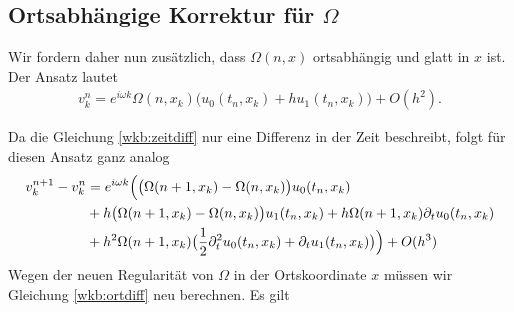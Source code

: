 \subsection*{Ortsabhängige Korrektur für $\Omega$}

Wir fordern daher nun zusätzlich, dass $\Omega(n,x)$ ortsabhängig und glatt in $x$ ist.
Der Ansatz lautet
\begin{align}
v^n_k = e^{i \omega k} \Omega(n, x_k) \bigl( u_0(t_n, x_k) + h u_1(t_n, x_k) \bigr) + O(h^2).
\end{align}

Da die Gleichung \eqref{wkb:zeitdiff} nur eine Differenz in der Zeit beschreibt, folgt für diesen Ansatz ganz analog
\begin{align}
\begin{split}
v^{n+1}_k - v^n_k &= e^{i \omega k} \Bigl( \bigl(\Omega(n+1, x_k) - \Omega(n,x_k) \bigr) u_0(t_n, x_k)\\
&+ h \bigl(\Omega(n+1,x_k) - \Omega(n,x_k) \bigr) u_1(t_n, x_k) + h \Omega(n+1, x_k) \partial_t u_0(t_n, x_k)\\
&+ h^2 \Omega(n+1, x_k) \bigl( \frac{1}{2} \partial^2_t u_0(t_n, x_k) + \partial_t u_1(t_n, x_k) \bigr) \Bigr) + O(h^3)
\end{split}
\end{align}
Wegen der neuen Regularität von $\Omega$ in der Ortskoordinate $x$ müssen wir Gleichung \eqref{wkb:ortdiff} neu berechnen.
Es gilt

